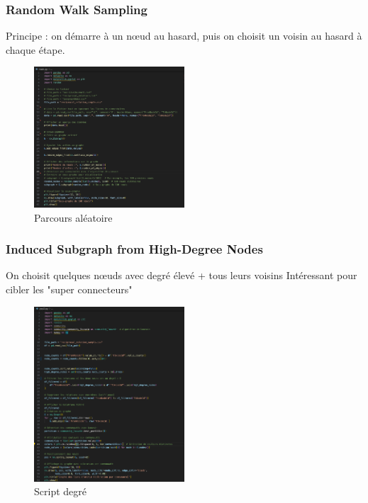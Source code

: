 \documentclass[a4paper, 12pt, twoside]{article}
\begin{document}
    \subsubsection{Random Walk Sampling}
    Principe : on démarre à un nœud au hasard, puis on choisit un voisin au hasard à chaque étape.
        \begin{figure}[H]
            \centering        \includegraphics[width=0.5\textwidth]{Random Walk Sampling.png}
            \caption{Parcours aléatoire}
            \label{fig:label_image}
        \end{figure}

 
    \subsubsection{Induced Subgraph from High-Degree Nodes}
    On choisit quelques nœuds avec degré élevé + tous leurs voisins Intéressant pour cibler les "super connecteurs"

        \begin{figure}[H]
            \centering
            \includegraphics[width=0.5\textwidth]{degree.png}
            \caption{Script degré}
            \label{fig:label_image}
        \end{figure}
\end{document}
